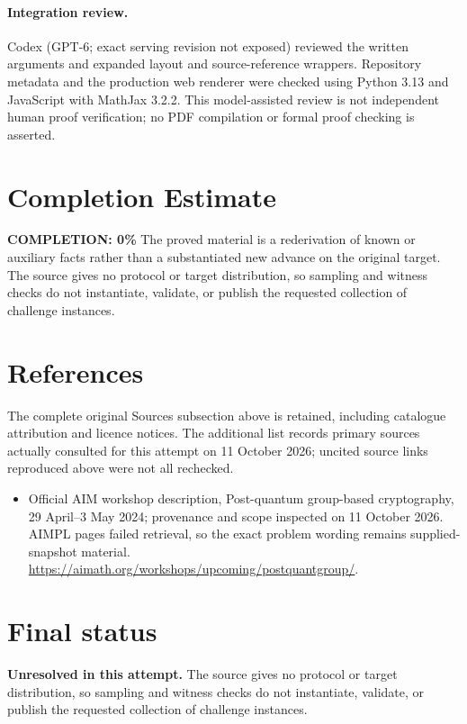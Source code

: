 \documentclass[11pt]{article}
\begin{document}
\paragraph{Integration review.} Codex (GPT-6; exact serving revision not exposed) reviewed the written arguments and expanded layout and source-reference wrappers. Repository metadata and the production web renderer were checked using Python 3.13 and JavaScript with MathJax 3.2.2. This model-assisted review is not independent human proof verification; no PDF compilation or formal proof checking is asserted.

\section{Completion Estimate}
\noindent\textbf{COMPLETION: 0\%}
The proved material is a rederivation of known or auxiliary facts rather than a substantiated new advance on the original target. The source gives no protocol or target distribution, so sampling and witness checks do not instantiate, validate, or publish the requested collection of challenge instances.
\section{References}
The complete original Sources subsection above is retained, including catalogue attribution and licence notices. The additional list records primary sources actually consulted for this attempt on 11 October 2026; uncited source links reproduced above were not all rechecked.
\begin{itemize}
\item Official AIM workshop description, Post-quantum group-based cryptography, 29 April--3 May 2024; provenance and scope inspected on 11 October 2026. AIMPL pages failed retrieval, so the exact problem wording remains supplied-snapshot material. \url{https://aimath.org/workshops/upcoming/postquantgroup/}.
\end{itemize}
\section{Final status}
\textbf{Unresolved in this attempt.} The source gives no protocol or target distribution, so sampling and witness checks do not instantiate, validate, or publish the requested collection of challenge instances.
\end{document}
